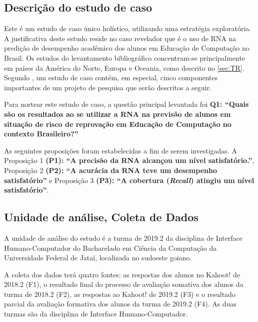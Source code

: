 \documentclass[
	12pt,				%
	openright,			%
	oneside,
	a4paper,			%
	english,			%
	french,				%
	spanish,			%
	brazil,				%
	]{abntex2}
\begin{document}
\subsection{Descrição do estudo de caso}
Este é um estudo de caso único holístico, utilizando uma estratégia exploratória. A justiﬁcativa deste estudo reside no caso revelador que é o uso de RNA na predição de desempenho acadêmico dos alunos em Educação de Computação no Brasil. Os estudos do levantamento bibliográfico concentram-se principalmente em países da América do Norte, Europa e Oceania, como descrito no \autoref{sec:TR}.
Segundo , um estudo de caso contém, em especial, cinco componentes importantes de um projeto de pesquisa que serão descritos a seguir.

Para nortear este estudo de caso, a questão principal levantada foi \textbf{Q1: ``Quais são os resultados ao se utilizar a RNA na previsão de alunos em situação de risco de reprovação em Educação de Computação no contexto Brasileiro?''}

As seguintes proposições foram estabelecidas a fim de serem investigadas. A Proposição 1 \textbf{(P1): ``A precisão da RNA alcançou um nível satisfatório.''}, Proposição 2 \textbf{(P2): ``A acurácia da RNA teve um desempenho satisfatório''} e Proposição 3 \textbf{(P3): ``A cobertura (\textit{Recall}) atingiu um nível satisfatório''}.

\subsection{Unidade de análise, Coleta de Dados}
A unidade de análise do estudo é a turma de 2019.2 da disciplina de Interface Humano-Computador do Bacharelado em Ciência da Computação da Universidade Federal de Jataí, localizada no sudoeste goiano.

A coleta dos dados terá quatro fontes: as respostas dos alunos no Kahoot! de 2018.2 (F1), o resultado final do processo de avaliação somativa dos alunos da turma de 2018.2 (F2), as respostas ao Kahoot! de 2019.2 (F3) e o resultado parcial da avaliação formativa dos alunos da turma de 2019.2 (F4). As duas turmas são da disciplina de Interface Humano-Computador. 
\end{document}
